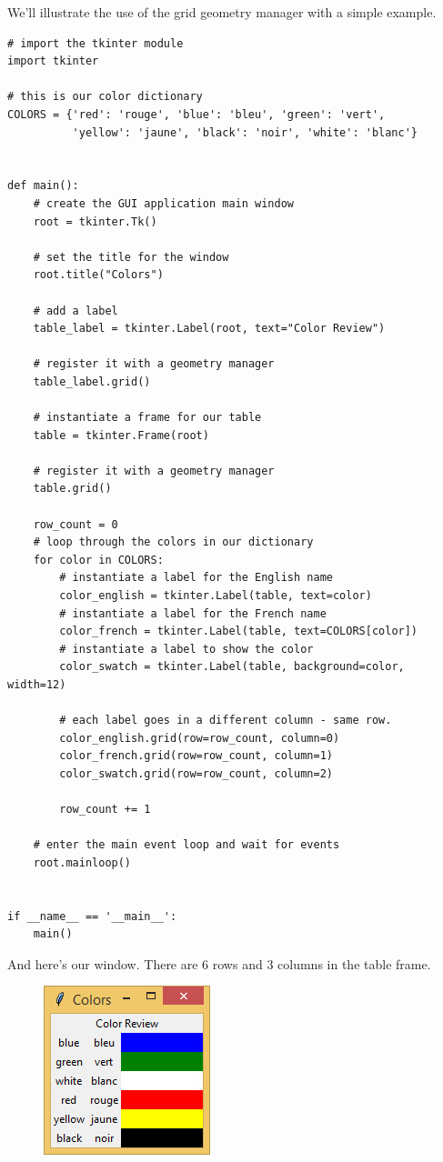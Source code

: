 \documentclass{article}
\begin{document}
We'll illustrate the use of the grid geometry manager with a simple example.

\begin{lstlisting}
# import the tkinter module
import tkinter

# this is our color dictionary
COLORS = {'red': 'rouge', 'blue': 'bleu', 'green': 'vert',
          'yellow': 'jaune', 'black': 'noir', 'white': 'blanc'}


def main():
    # create the GUI application main window
    root = tkinter.Tk()

    # set the title for the window
    root.title("Colors")

    # add a label
    table_label = tkinter.Label(root, text="Color Review")

    # register it with a geometry manager
    table_label.grid()

    # instantiate a frame for our table
    table = tkinter.Frame(root)

    # register it with a geometry manager
    table.grid()

    row_count = 0
    # loop through the colors in our dictionary
    for color in COLORS:
        # instantiate a label for the English name
        color_english = tkinter.Label(table, text=color)
        # instantiate a label for the French name
        color_french = tkinter.Label(table, text=COLORS[color])
        # instantiate a label to show the color
        color_swatch = tkinter.Label(table, background=color, width=12)

        # each label goes in a different column - same row.
        color_english.grid(row=row_count, column=0)
        color_french.grid(row=row_count, column=1)
        color_swatch.grid(row=row_count, column=2)

        row_count += 1

    # enter the main event loop and wait for events
    root.mainloop()


if __name__ == '__main__':
    main()
\end{lstlisting}

And here's our window.  There are 6 rows and 3 columns in the table frame.
\begin{figure}[h]
\includegraphics[scale=.6]{colorreview}
\end{figure}\\
\end{document}
